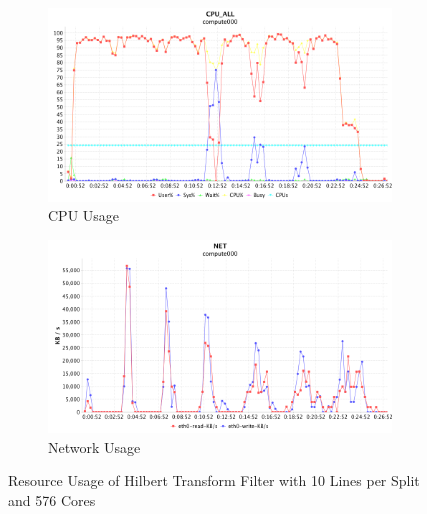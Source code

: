 \begin{figure}[h]
\centering
\begin{subfigure}{1\textwidth}
  \centering
  \includegraphics[width=1\linewidth]{figures/Htf10_576_CPU.png}
  \caption{CPU Usage}
  \label{Htf10_576_CPU}
\end{subfigure}
\begin{subfigure}{1\textwidth}
  \centering
  \includegraphics[width=1\linewidth]{figures/Htf10_576_NET.png}
  \caption{Network Usage}
  \label{Htf10_576_NET}
\end{subfigure}
\caption{Resource Usage of Hilbert Transform Filter with 10 Lines per Split and 576 Cores}
\label{Htf10_576}
\end{figure}

